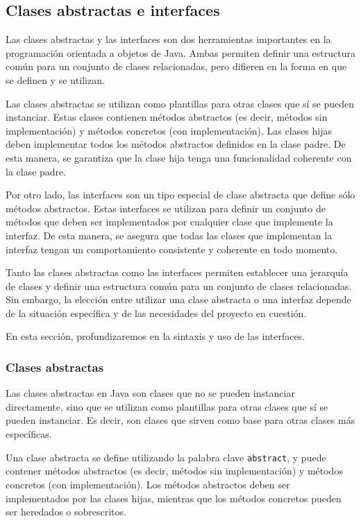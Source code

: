 \documentclass[executivepaper]{article}
\begin{document}
\subsection{Clases abstractas e interfaces}
Las clases abstractas y las interfaces son dos herramientas importantes en la programación orientada a objetos de Java. Ambas permiten definir una estructura común para un conjunto de clases relacionadas, pero difieren en la forma en que se definen y se utilizan.

Las clases abstractas se utilizan como plantillas para otras clases que sí se pueden instanciar. Estas clases contienen métodos abstractos (es decir, métodos sin implementación) y métodos concretos (con implementación). Las clases hijas deben implementar todos los métodos abstractos definidos en la clase padre. De esta manera, se garantiza que la clase hija tenga una funcionalidad coherente con la clase padre.

Por otro lado, las interfaces son un tipo especial de clase abstracta que define sólo métodos abstractos. Estas interfaces se utilizan para definir un conjunto de métodos que deben ser implementados por cualquier clase que implemente la interfaz. De esta manera, se asegura que todas las clases que implementan la interfaz tengan un comportamiento consistente y coherente en todo momento.

Tanto las clases abstractas como las interfaces permiten establecer una jerarquía de clases y definir una estructura común para un conjunto de clases relacionadas. Sin embargo, la elección entre utilizar una clase abstracta o una interfaz depende de la situación específica y de las necesidades del proyecto en cuestión.

En esta sección, profundizaremos en la sintaxis y uso de las interfaces.

\subsubsection{Clases abstractas}

Las clases abstractas en Java son clases que no se pueden instanciar directamente, sino que se utilizan como plantillas para otras clases que sí se pueden instanciar. Es decir, son clases que sirven como base para otras clases más específicas.

Una clase abstracta se define utilizando la palabra clave \texttt{abstract}, y puede contener métodos abstractos (es decir, métodos sin implementación) y métodos concretos (con implementación). Los métodos abstractos deben ser implementados por las clases hijas, mientras que los métodos concretos pueden ser heredados o sobrescritos.
\end{document}
